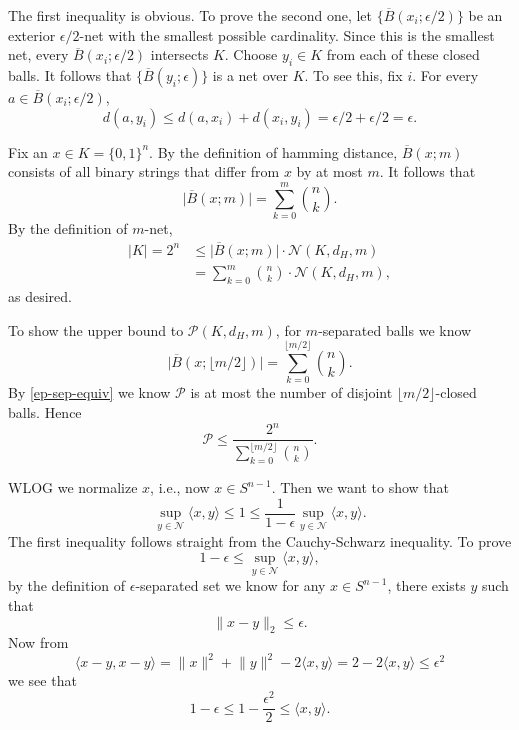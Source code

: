 \documentclass[11pt]{article}
\newcommand{\inp}[2]{\langle #1, #2 \rangle}
\newcommand{\nm}[1]{\lVert #1 \rVert}
\newcommand{\abs}[1]{\lvert #1 \rvert}
\newcommand{\ol}[1]{\overline{#1}}
\newcommand{\floor}[1]{\lfloor #1 \rfloor}
\theoremstyle{plain}
\theoremstyle{definition}
\theoremstyle{remark}
\theoremstyle{definition}
\newenvironment{mansol}[1]{%
  \renewcommand\themansolinner{#1}%
  \mansolinner
}{\endmansolinner}
\begin{document}
\begin{mansol}{4.2.9}
The first inequality is obvious. To prove the second one, let $\{\ol{B}(x_i;\epsilon/2)\}$ be an exterior $\epsilon/2$-net with the smallest possible cardinality. Since this is the smallest net, every $\ol{B}(x_i;\epsilon/2)$ intersects $K$. Choose $y_i \in K$ from each of these closed balls. It follows that $\{\ol{B}(y_i;\epsilon)\}$ is a net over $K$. To see this, fix $i$. For every $a \in \ol{B}(x_i;\epsilon/2)$, \[
d(a,y_i) \leq d(a,x_i) + d(x_i,y_i) = \epsilon/2 + \epsilon/2 = \epsilon.
\]
\end{mansol}

\begin{mansol}{4.2.16}
Fix an $x \in K = \{0,1\}^n$. By the definition of hamming distance, $\ol{B}(x;m)$ consists of all binary strings that differ from $x$ by at most $m$. It follows that \[
\abs{\ol{B}(x;m)} = \sum_{k=0}^m \binom{n}{k}.
\]
By the definition of $m$-net, \begin{align*}
\abs{K} = 2^n & \leq \abs{\ol{B}(x;m)} \cdot \mathcal{N}(K,d_H,m) \\
& = \sum_{k=0}^m \binom{n}{k} \cdot \mathcal{N}(K,d_H,m),
\end{align*} as desired.

To show the upper bound to $\mathcal{P}(K,d_H,m)$, for $m$-separated balls we know \[\big \lvert \ol{B}(x;\floor{m/2}) \big \rvert = \sum_{k=0}^{\floor{m/2}}\binom{n}{k}.\] By \ref{ep-sep-equiv} we know $\mathcal{P}$ is at most the number of disjoint $\floor{m/2}$-closed balls. Hence \[\mathcal{P} \leq \frac{2^n}{\sum_{k=0}^{\floor{m/2}}\binom{n}{k}}.\]
\end{mansol}

\begin{mansol}{4.4.2}
    WLOG we normalize $x$, i.e., now $x \in S^{n-1}$. Then we want to show that \[\sup_{y \in \mathcal{N}} \inp{x}{y} \leq 1 \leq \frac{1}{1-\epsilon} \sup_{y\in \mathcal{N}} \inp{x}{y}.\]
    The first inequality follows straight from the Cauchy-Schwarz inequality. To prove \[1-\epsilon \leq \sup_{y \in \mathcal{N}} \inp{x}{y},\] by the definition of $\epsilon$-separated set we know for any $x \in S^{n-1}$, there exists $y$ such that \[
    \nm{x-y}_2 \leq \epsilon.
    \]
    Now from \[\inp{x - y}{x - y} = \nm{x}^2 + \nm{y}^2 -2\inp{x}{y} = 2 - 2\inp{x}{y} \leq \epsilon^2\] we see that \[1 - \epsilon \leq 1 - \frac{\epsilon^2}{2} \leq \inp{x}{y}.\]
\end{mansol}
\end{document}
